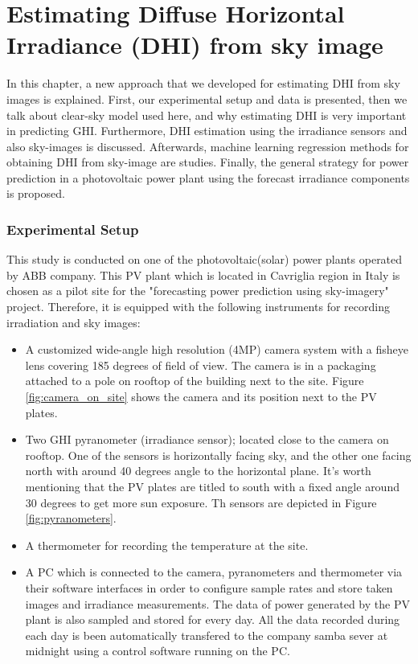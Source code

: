\chapter{Estimating Diffuse Horizontal Irradiance (DHI) from sky image}
In this chapter, a new approach that we developed for estimating DHI from sky images is explained. First, our experimental setup and data is presented, then we talk about clear-sky model used here, and why estimating DHI is very important in predicting GHI. Furthermore, DHI estimation using the irradiance sensors and also sky-images is discussed. Afterwards, machine learning regression methods for obtaining DHI from sky-image are studies. Finally, the general strategy for power prediction in a photovoltaic power plant using the forecast irradiance components is proposed.

\subsection{Experimental Setup}
This study is conducted on one of the photovoltaic(solar) power plants operated by ABB company. This PV plant which is located in Cavriglia region in Italy is chosen as a pilot site for the "forecasting power prediction using sky-imagery" project. Therefore, it is equipped with the following instruments for recording irradiation and sky images:
\begin{itemize}
\item A customized wide-angle high resolution (4MP) camera system with a fisheye lens covering 185 degrees of field of view. The camera is in a packaging attached to a pole on rooftop of the building next to the site. Figure \ref{fig:camera_on_site} shows the camera and its position next to the PV plates.
\item Two GHI pyranometer (irradiance sensor); located close to the camera on rooftop. One of the sensors is horizontally facing sky, and the other one facing north with around 40 degrees angle to the horizontal plane. It's worth mentioning that the PV plates are titled to south with a fixed angle around 30 degrees to get more sun exposure.  Th sensors are depicted in Figure \ref{fig:pyranometers}.
\item A thermometer for recording the temperature at the site.
\item A PC which is connected to the camera, pyranometers and thermometer via their software interfaces in order to configure sample rates and store taken images and irradiance measurements. The data of power generated by the PV plant is also sampled and stored for every day. All the data recorded during each day is been automatically transfered to the company samba sever at midnight using a control software running on the PC.
\end{itemize}

